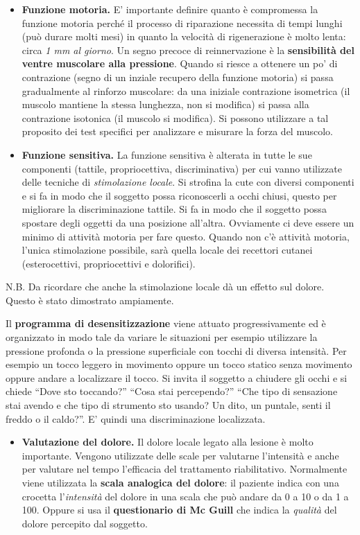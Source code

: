 \documentclass[]{article}
\begin{document}
\begin{itemize}
\item
  \textbf{Funzione motoria.} E' importante definire quanto è compromessa
  la funzione motoria perché il processo di riparazione necessita di
  tempi lunghi (può durare molti mesi) in quanto la velocità di
  rigenerazione è molto lenta: circa \emph{1 mm al giorno}. Un segno
  precoce di reinnervazione è la \textbf{sensibilità del ventre
  muscolare alla pressione}. Quando si riesce a ottenere un po' di
  contrazione (segno di un inziale recupero della funzione motoria) si
  passa gradualmente al rinforzo muscolare: da una iniziale contrazione
  isometrica (il muscolo mantiene la stessa lunghezza, non si modifica)
  si passa alla contrazione isotonica (il muscolo si modifica). Si
  possono utilizzare a tal proposito dei test specifici per analizzare e
  misurare la forza del muscolo.
\item
  \textbf{Funzione sensitiva.} La funzione sensitiva è alterata in tutte
  le sue componenti (tattile, propriocettiva, discriminativa) per cui
  vanno utilizzate delle tecniche di \emph{stimolazione locale}. Si
  strofina la cute con diversi componenti e si fa in modo che il
  soggetto possa riconoscerli a occhi chiusi, questo per migliorare la
  discriminazione tattile. Si fa in modo che il soggetto possa spostare
  degli oggetti da una posizione all'altra. Ovviamente ci deve essere un
  minimo di attività motoria per fare questo. Quando non c'è attività
  motoria, l'unica stimolazione possibile, sarà quella locale dei
  recettori cutanei (esterocettivi, propriocettivi e dolorifici).
\end{itemize}

N.B. Da ricordare che anche la stimolazione locale dà un effetto sul
dolore. Questo è stato dimostrato ampiamente.

Il \textbf{programma di desensitizzazione} viene attuato
progressivamente ed è organizzato in modo tale da variare le situazioni
per esempio utilizzare la pressione profonda o la pressione superficiale
con tocchi di diversa intensità. Per esempio un tocco leggero in
movimento oppure un tocco statico senza movimento oppure andare a
localizzare il tocco. Si invita il soggetto a chiudere gli occhi e si
chiede ``Dove sto toccando?'' ``Cosa stai percependo?'' ``Che tipo di
sensazione stai avendo e che tipo di strumento sto usando? Un dito, un
puntale, senti il freddo o il caldo?''. E' quindi una discriminazione
localizzata.

\begin{itemize}
\item
  \textbf{Valutazione del dolore.} Il dolore locale legato alla lesione
  è molto importante. Vengono utilizzate delle scale per valutarne
  l'intensità e anche per valutare nel tempo l'efficacia del trattamento
  riabilitativo. Normalmente viene utilizzata la \textbf{scala analogica
  del dolore}: il paziente indica con una crocetta l'\emph{intensità}
  del dolore in una scala che può andare da 0 a 10 o da 1 a 100. Oppure
  si usa il \textbf{questionario di Mc Guill} che indica la
  \emph{qualità} del dolore percepito dal soggetto.
\end{itemize}
\end{document}
